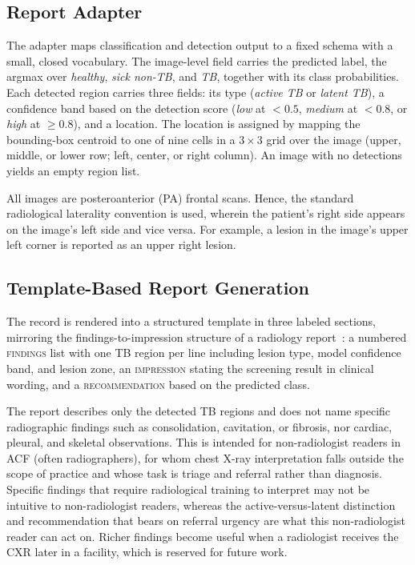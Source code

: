 \documentclass[conference, letterpaper]{IEEEtran}
\begin{document}
\subsection{Report Adapter}

The adapter maps classification and detection output to a fixed schema with a small, closed vocabulary. The image-level field carries the predicted label, the argmax over \textit{healthy}, \textit{sick non-TB}, and \textit{TB}, together with its class probabilities. Each detected region carries three fields: its type (\textit{active TB} or \textit{latent TB}), a confidence band based on the detection score (\textit{low} at $<0.5$, \textit{medium} at $<0.8$, or \textit{high} at $\geq0.8$), and a location. The location is assigned by mapping the bounding-box centroid to one of nine cells in a $3\times3$ grid over the image (upper, middle, or lower row; left, center, or right column). An image with no detections yields an empty region list.

All images are posteroanterior (PA) frontal scans. Hence, the standard radiological laterality convention is used, wherein the patient's right side appears on the image's left side and vice versa. For example, a lesion in the image's upper left corner is reported as an upper right lesion.

\subsection{Template-Based Report Generation}

The record is rendered into a structured template in three labeled sections, mirroring the findings-to-impression structure of a radiology report~\cite{zhang2024llm_impressions}: a numbered \textsc{findings} list with one TB region per line including lesion type, model confidence band, and lesion zone, an \textsc{impression} stating the screening result in clinical wording, and a \textsc{recommendation} based on the predicted class.

The report describes only the detected TB regions and does not name specific radiographic findings such as consolidation, cavitation, or fibrosis, nor cardiac, pleural, and skeletal observations. This is intended for non-radiologist readers in ACF (often radiographers), for whom chest X-ray interpretation falls outside the scope of practice and whose task is triage and referral rather than diagnosis. Specific findings that require radiological training to interpret may not be intuitive to non-radiologist readers, whereas the active-versus-latent distinction and recommendation that bears on referral urgency are what this non-radiologist reader can act on. Richer findings become useful when a radiologist receives the CXR later in a facility, which is reserved for future work.
\end{document}
